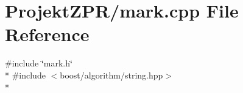 \section{Projekt\-Z\-P\-R/mark.cpp File Reference}
\label{mark_8cpp}
{\ttfamily \#include \char`\"{}mark.\-h\char`\"{}}\\*
{\ttfamily \#include $<$boost/algorithm/string.\-hpp$>$}\\*

